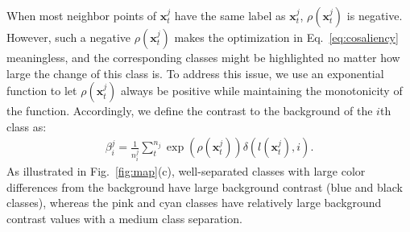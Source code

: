 When most neighbor points of $\mathbf{x}^j_t$ have the same label as $\mathbf{x}^j_t$,  $\rho (\mathbf{x}^j_t)$ is negative.
However, such a negative $\rho (\mathbf{x}^j_t)$ makes the optimization in Eq.~\ref{eq:cosaliency} meaningless, and the corresponding classes might be highlighted no matter how large the change of this class is.
To address this issue, we use an exponential function to let $\rho (\mathbf{x}^j_t)$  always be positive while maintaining the monotonicity of the function. Accordingly, we define
the contrast to the background of the $i$th class as:
\begin{align}\label{eq:ctbc}
 \beta^j_i = \frac{1}{n^j_i}\sum^{n_j}_{t} \exp(\rho(\mathbf{x}^j_t)) \delta(l(\mathbf{x}^j_t),i).
\end{align}
As illustrated in Fig.~\ref{fig:map}(c), well-separated classes with large color differences from the background have large background contrast (blue and black classes), whereas the pink and cyan classes have relatively large background contrast values with a medium class separation.




